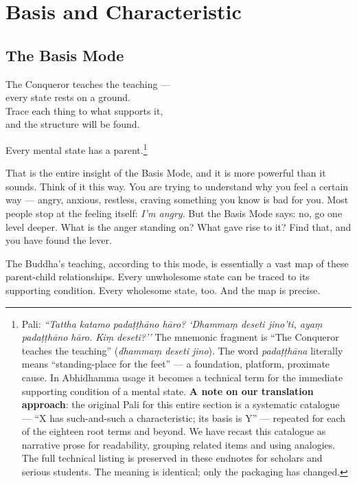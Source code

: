\chapter{Basis and Characteristic}
\label{ch:basis}

\section*{The Basis Mode}

\begin{versebox}
The Conqueror teaches the teaching ---\\
every state rests on a ground.\\
Trace each thing to what supports it,\\
and the structure will be found.
\end{versebox}

\noindent Every mental state has a parent.\footnote{Pali: \textit{``Tattha katamo padaṭṭhāno hāro? `Dhammaṃ deseti jino'ti, ayaṃ padaṭṭhāno hāro. Kiṃ deseti?''} The mnemonic fragment is ``The Conqueror teaches the teaching'' (\textit{dhammaṃ deseti jino}). The word \textit{padaṭṭhāna} literally means ``standing-place for the feet'' --- a foundation, platform, proximate cause. In Abhidhamma usage it becomes a technical term for the immediate supporting condition of a mental state. \textbf{A note on our translation approach}: the original Pali for this entire section is a systematic catalogue --- ``X has such-and-such a characteristic; its basis is Y'' --- repeated for each of the eighteen root terms and beyond. We have recast this catalogue as narrative prose for readability, grouping related items and using analogies. The full technical listing is preserved in these endnotes for scholars and serious students. The meaning is identical; only the packaging has changed.}

That is the entire insight of the Basis Mode, and it is more powerful than it sounds. Think of it this way. You are trying to understand why you feel a certain way --- angry, anxious, restless, craving something you know is bad for you. Most people stop at the feeling itself: \textit{I'm angry}. But the Basis Mode says: no, go one level deeper. What is the anger standing on? What gave rise to it? Find that, and you have found the lever.

The Buddha's teaching, according to this mode, is essentially a vast map of these parent-child relationships. Every unwholesome state can be traced to its supporting condition. Every wholesome state, too. And the map is precise.

